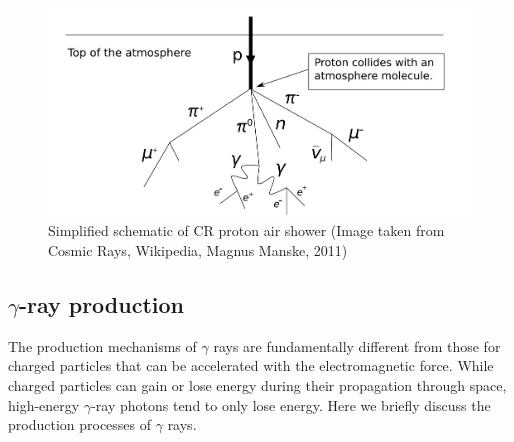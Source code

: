 \begin{figure}[h!]
    \centering
    \includegraphics[width=\textwidth]{content/background/figures/Atmospheric_Collision.pdf}
    \caption{
        Simplified schematic of CR proton air shower
        (Image taken from Cosmic Rays, Wikipedia, Magnus Manske, 2011)
    }
    \label{fig:cr_shower}
\end{figure}


\subsection{$\gamma$-ray production}

The production mechanisms of $\gamma$ rays are fundamentally
different from those for charged particles that can be
accelerated with the electromagnetic force.
While charged particles can gain or lose energy during their
propagation through space, high-energy $\gamma$-ray photons
tend to only lose energy.
Here we briefly discuss the production processes of $\gamma$ rays.


